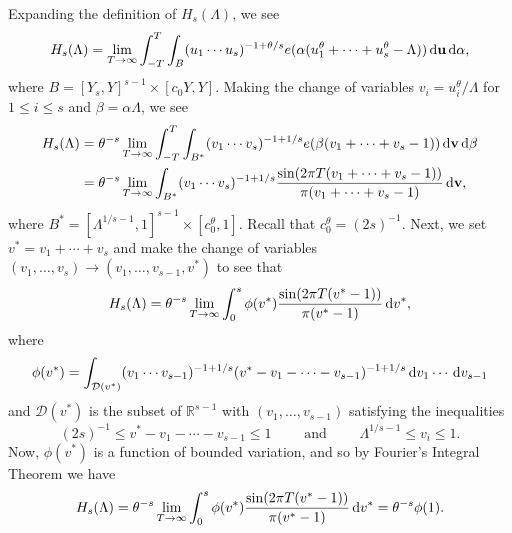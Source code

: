 \documentclass[11pt,reqno]{amsart}
\numberwithin{equation}{section}
\renewcommand{\d}{\,{\rm d}}
\begin{document}
Expanding the definition of $H_s(\Lambda)$, we see 
\[ H_s(\Lambda) = \lim_{T \to \infty} \int_{-T}^{T} \int_{B} (u_1\cdots u_s)^{-1+\theta/s}e(\alpha(u_1^{\theta}+\cdots+u_s^{\theta}-\Lambda))\d\mathbf{u}\d\alpha, \]
where $B = [Y_s,Y]^{s-1}\times[c_0Y,Y]$. 
Making the change of variables $v_i = u_i^{\theta}/\Lambda$ for $1 \leq i \leq s$ and $\beta = \alpha \Lambda$, we see 
\begin{align*} H_s(\Lambda) & = \theta^{-s} \lim_{T \to \infty} \int_{-T}^{T} \int_{B^*} (v_1\cdots v_s)^{-1+1/s}e(\beta(v_1+\cdots+v_s-1))\d\mathbf{v}\d\beta \\ & = \theta^{-s} \lim_{T \to \infty} \int_{B^*} (v_1\cdots v_s)^{-1+1/s} \frac{\sin(2\pi T(v_1+\cdots+v_s-1))}{\pi(v_1+\cdots+v_s-1)}\d\mathbf{v}, 
\end{align*}
where $B^* = [\Lambda^{1/s-1},1]^{s-1}\times[c_0^{\theta},1] $. Recall that $c_0^{\theta} = (2s)^{-1}$. Next, we set $v^* = v_1+\cdots+v_{s}$ and make the change of variables $(v_1,\ldots,v_s) \to (v_1,\ldots, v_{s-1},v^*)$ to see that 
\[ H_s(\Lambda) = \theta^{-s} \lim_{T \to \infty} \int_{0}^s \phi(v^*) \frac{\sin(2\pi T(v^*-1))}{\pi(v^*-1)}\d v^*, \]
where 
\[ \phi(v^*) = \int_{\mathcal{D}(v^*)} (v_1\cdots v_{s-1})^{-1+1/s} (v^*-v_1-\cdots-v_{s-1})^{-1+1/s}\d v_1\cdots \d v_{s-1} \]
and $\mathcal{D}(v^*)$ is the subset of $\mathbb{R}^{s-1}$ with $(v_1,\ldots, v_{s-1})$ satisfying the inequalities 
\[ (2s)^{-1} \leq v^*-v_1-\cdots-v_{s-1} \leq 1 \quad \quad \text{ and } \quad \quad \Lambda^{1/s-1} \leq v_i \leq 1. \]
Now, $\phi(v^*)$ is a function of bounded variation,  
and so by Fourier's Integral Theorem we have 
\[ H_s(\Lambda) = \theta^{-s} \lim_{T \to \infty} \int_{0}^s \phi(v^*) \frac{\sin(2\pi T(v^*-1))}{\pi(v^*-1)}\d v^* = \theta^{-s}\phi(1). \]
\end{document}
